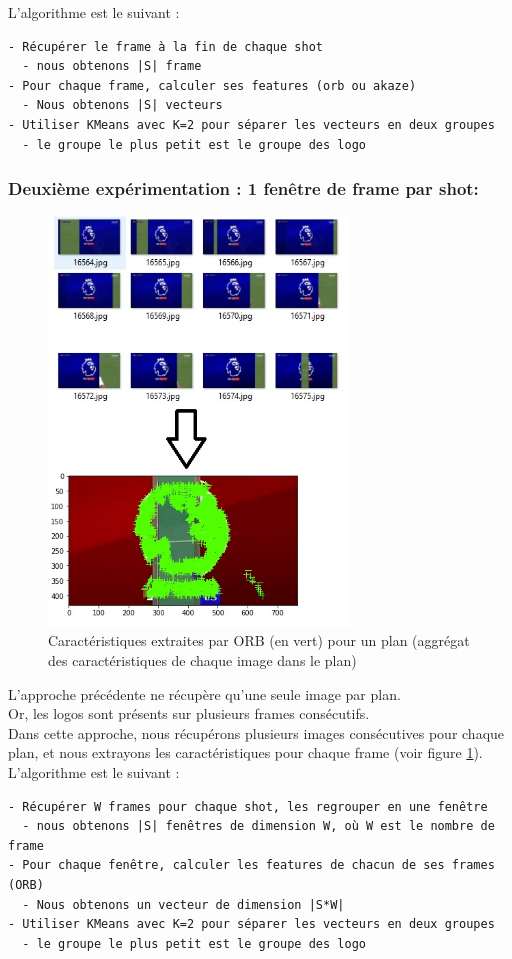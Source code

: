 \documentclass[11pt]{article}
\begin{document}
L'algorithme est le suivant :\\
\begin{verbatim}
- Récupérer le frame à la fin de chaque shot
  - nous obtenons |S| frame
- Pour chaque frame, calculer ses features (orb ou akaze)
  - Nous obtenons |S| vecteurs
- Utiliser KMeans avec K=2 pour séparer les vecteurs en deux groupes
  - le groupe le plus petit est le groupe des logo
\end{verbatim}

\subsubsection{Deuxième expérimentation : 1 fenêtre de frame par shot:}
\label{sec:org133be9f}
\begin{figure}[htbp]
\centering
\includegraphics[width=8cm]{akaze_window_res.jpg}
\caption{Caractéristiques extraites par ORB (en vert) pour un plan (aggrégat des caractéristiques de chaque image dans le plan) \label{orb-window}}
\end{figure}
L'approche précédente ne récupère qu'une seule image par plan.\\
Or, les logos sont présents sur plusieurs frames consécutifs.\\
Dans cette approche, nous récupérons plusieurs images consécutives pour chaque plan, et nous extrayons les caractéristiques pour chaque frame (voir figure \ref{orb-window}).\\

L'algorithme est le suivant :\\
\begin{verbatim}
- Récupérer W frames pour chaque shot, les regrouper en une fenêtre
  - nous obtenons |S| fenêtres de dimension W, où W est le nombre de frame
- Pour chaque fenêtre, calculer les features de chacun de ses frames (ORB)
  - Nous obtenons un vecteur de dimension |S*W|
- Utiliser KMeans avec K=2 pour séparer les vecteurs en deux groupes
  - le groupe le plus petit est le groupe des logo
\end{verbatim}
\end{document}
